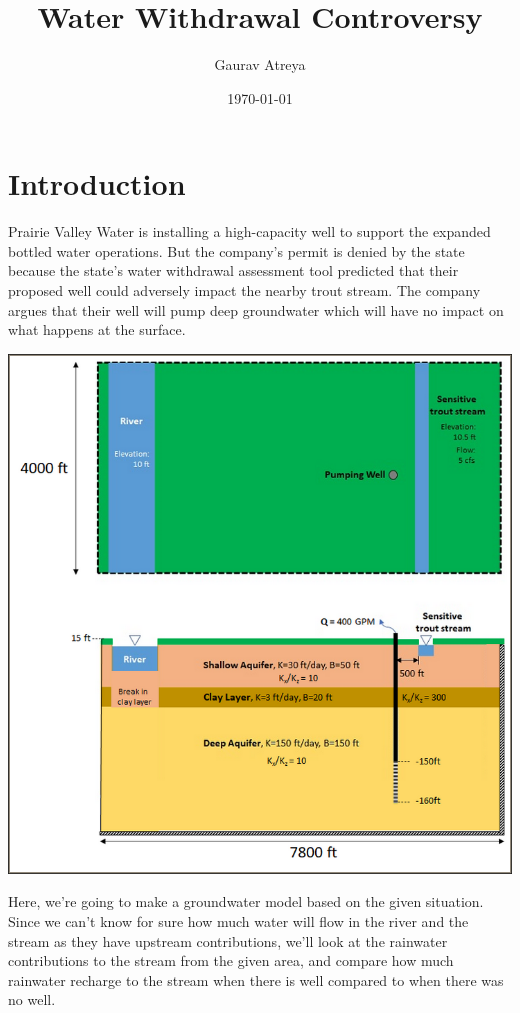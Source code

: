 \documentclass[titlepage,12pt]{unisubmission}
\author{Gaurav Atreya}
\date{\today}
\title{Water Withdrawal Controversy}
\begin{document}
\maketitle
\setcounter{tocdepth}{2}
\tableofcontents

\section{Introduction}
\label{sec:orgc48b41b}

Prairie Valley Water is installing a high-capacity well to support the expanded bottled water operations. But the company's permit is denied by the state because the state’s water withdrawal assessment tool predicted that their proposed well could adversely impact the nearby trout stream. The company argues that their well will pump deep groundwater which will have no impact on what happens at the surface. 

\begin{center}
\includegraphics[width=.9\linewidth]{./images/tutorial-3-site.png}
\end{center}

Here, we're going to make a groundwater model based on the given situation. Since we can't know for sure how much water will flow in the river and the stream as they have upstream contributions, we'll look at the rainwater contributions to the stream from the given area, and compare how much rainwater recharge to the stream when there is well compared to when there was no well.
\end{document}
